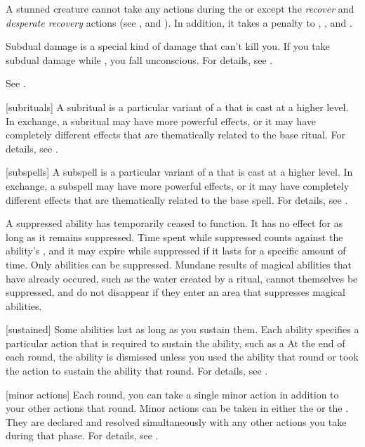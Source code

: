  A stunned creature cannot take any actions during the  or  except the \textit{recover} and \textit{desperate recovery} actions (see , and ).
In addition, it takes a  penalty to , , and .

 Subdual damage is a special kind of damage that can't kill you.
If you take subdual damage while , you fall unconscious.
For details, see .

 See .

[subrituals] A subritual is a particular variant of a  that is cast at a higher level.
In exchange, a subritual may have more powerful effects, or it may have completely different effects that are thematically related to the base ritual.
For details, see .

[subspells] A subspell is a particular variant of a  that is cast at a higher level.
In exchange, a subspell may have more powerful effects, or it may have completely different effects that are thematically related to the base spell.
For details, see .

 A suppressed ability has temporarily ceased to function.
It has no effect for as long as it remains suppressed.
Time spent while suppressed counts against the ability's , and it may expire while suppressed if it lasts for a specific amount of time.
Only  abilities can be suppressed.
Mundane results of magical abilities that have already occured, such as the water created by a  ritual, cannot themselves be suppressed, and do not disappear if they enter an area that suppresses magical abilities.

[sustained] Some abilities last as long as you sustain them.
Each ability specifies a particular action that is required to sustain the ability, such as a 
At the end of each round, the ability is dismissed unless you used the ability that round or took the action to sustain the ability that round.
For details, see .

[minor actions] Each round, you can take a single minor action in addition to your other actions that round.
Minor actions can be taken in either the  or the .
They are declared and resolved simultaneously with any other actions you take during that phase.
For details, see .

